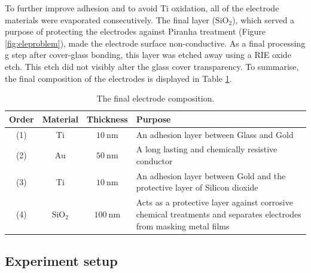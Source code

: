 \documentclass[final]{jyflluk}
\begin{document}
To further improve adhesion and to avoid Ti oxidation, all of the electrode materials were evaporated consecutively. The final layer ($\mathrm{SiO_2}$), which served a purpose of protecting the electrodes against Piranha treatment (Figure \ref{fig:eleproblem}), made the electrode surface non-conductive. As a final processing
g step after cover-glass bonding, this layer was etched away using a RIE oxide etch. This etch did not visibly alter the glass cover transparency. To summarise, the final composition of the electrodes is displayed in Table \ref{tab:electrde}.


\begin{table}[h]
    \centering
    \caption{The final electrode composition.}
    \label{tab:electrde}
    \begin{tabular}{||c c c p{10cm}||} \toprule
       Order    & Material & Thickness & Purpose\\ \midrule
       (1)   &  Ti  &  $\SI{10}{\nano \metre}$  & An adhesion layer between Glass and Gold     \\ \hline
       (2)  &  Au  &  $\SI{50}{\nano \metre}$ & A long lasting and chemically resistive conductor \\\hline
       (3)  &  Ti  &  $\SI{10}{\nano \metre}$ & An adhesion layer between Gold and the protective layer of Silicon dioxide\\\hline
       (4)   &  $\mathrm{SiO_2}$  &  $\SI{100}{\nano \metre}$  & Acts as a protective layer against corrosive chemical treatments and separates electrodes from masking metal films    \\
         \bottomrule
    \end{tabular}
 \end{table}


 


\subsection{Experiment setup}
\label{sec:xxx5}
\end{document}
